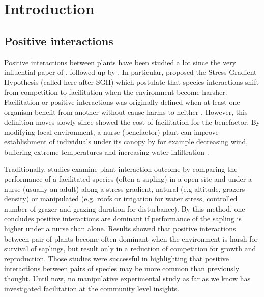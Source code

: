 \documentclass[12pt]{article} %
\begin{document}
\section{Introduction}

\subsection{Positive interactions}
Positive interactions between plants have been studied a lot since the very influential paper of \citep{Bertness1994}, followed-up by \citep{Bruno2003}. In particular, \citet{Bertness1994} proposed the Stress Gradient Hypothesis (called here after SGH) which postulate that species interactions shift from competition to facilitation when the environment become harsher. Facilitation or positive interactions was originally defined when at least one organism benefit from another without cause harms to neither \citep{Bruno2003}. However, this definition moves slowly since \citet{Schob2014} showed the cost of facilitation for the benefactor.
By modifying local environment, a nurse (benefactor) plant can improve establishment of individuals under its canopy by for example decreasing wind, buffering extreme temperatures and increasing water infiltration \citep{Rietkerk1997}. 

Traditionally, studies examine plant interaction outcome by comparing the performance of a facilitated species (often a sapling) in a open site and under a nurse (usually an adult) along a stress gradient, natural (e.g altitude, grazers density) or manipulated (e.g. roofs or irrigation for water stress, controlled number of grazer and grazing duration for disturbance).
By this method, one concludes positive interactions are dominant if performance of the sapling is higher under a nurse than alone. Results showed that positive interactions between pair of plants become often dominant when the environment is harsh for survival of saplings, but result only in a reduction of competition for growth and reproduction\citep{He2013}.
Those studies were successful in highlighting that positive interactions between pairs of species may be more common than previously thought. Until now, no manipulative experimental study as far as we know has investigated facilitation at the community level insights. 
\end{document}
